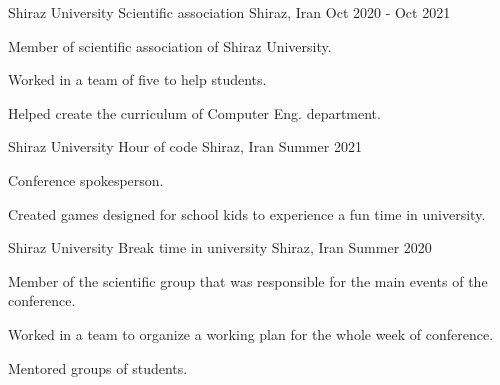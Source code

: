 

\begin{cventries}

  \cventry
    {Shiraz University} %
    {Scientific association} %
    {Shiraz, Iran} %
    {Oct 2020 - Oct 2021} %
    {
      \begin{cvitems} %
        \item {Member of scientific association of Shiraz University.}
        \item {Worked in a team of five to help students.}
        \item {Helped create the curriculum of Computer Eng. department.}
      \end{cvitems}
    }
  \cventry
    {Shiraz University} %
    {Hour of code} %
    {Shiraz, Iran} %
    {Summer 2021} %
    {
      \begin{cvitems} %
        \item {Conference spokesperson.}
        \item {Created games designed for school kids to experience a fun time in university.}
      \end{cvitems}
    }

  \cventry
    {Shiraz University} %
    {Break time in university} %
    {Shiraz, Iran} %
    {Summer 2020} %
    {
      \begin{cvitems} %
        \item {Member of the scientific group that was responsible for the main events of the conference.}
        \item {Worked in a team to organize a working plan for the whole week of conference.}
        \item {Mentored groups of students.}
      \end{cvitems}
    }


\end{cventries}
